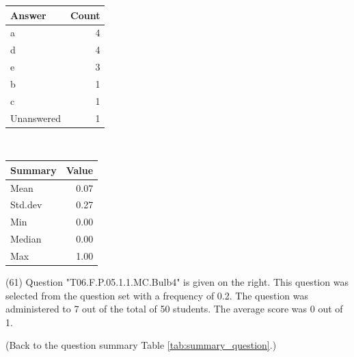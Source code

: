 \documentclass[12pt,english,nohyper]{tufte-handout}\usepackage[]{graphicx}\usepackage[]{color}
\begin{document}
\begin{center}%
\begin{tabular}{lr}
  \hline
Answer & Count \\ 
  \hline
a &   4 \\ 
  d &   4 \\ 
  e &   3 \\ 
  b &   1 \\ 
  c &   1 \\ 
  Unanswered &   1 \\ 
   \hline
\end{tabular}
~~~~~~~~%
\begin{tabular}{lr}
  \hline
Summary & Value \\ 
  \hline
Mean & 0.07 \\ 
  Std.dev & 0.27 \\ 
  Min & 0.00 \\ 
  Median & 0.00 \\ 
  Max & 1.00 \\ 
   \hline
\end{tabular}
\end{center}\newpage{} (61) Question "T06.F.P.05.1.1.MC.Bulb4" is given on the right. This question was selected from the question set with a frequency of 0.2. The question was administered to 7 out of the total of 50 students. The average score was 0 out of 1.

 (Back to the question summary Table \ref{tab:summary_question}.)
\end{document}
